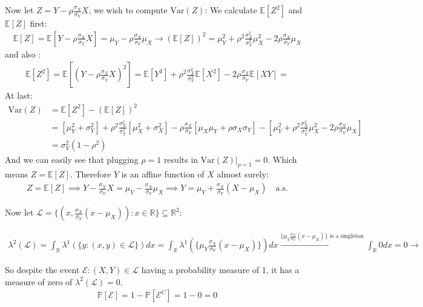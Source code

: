\documentclass{article}
\begin{document}
Now let $Z = Y - \rho\frac{\sigma_X}{\sigma_Y}X  $, we wish to compute $\text{Var}(Z)$:
We calculate $\mathbb{E} [Z^2]$ and $\mathbb{E} [Z]$ first:
\begin{align*}
\mathbb{E} [Z] = \mathbb{E} [  Y - \rho\frac{\sigma_X}{\sigma_Y}X] = \mu_Y - \rho \frac{\sigma_X}{\sigma_Y}\mu_X \xrightarrow{} (\mathbb{E} [Z])^2 = \mu_Y^2 + \rho^2 \frac{\sigma_X^2}{\sigma_Y^2}\mu_X^2 -2\rho\frac{\sigma_X}{\sigma_Y}\mu_X
\end{align*}
and also :
\begin{align*}
\mathbb{E} [Z^2] = \mathbb{E} [  (Y - \rho\frac{\sigma_X}{\sigma_Y}X)^2] = 
\mathbb{E} [Y^2] + \rho^2 \frac{\sigma_X^2}{\sigma_Y^2} \mathbb{E} [X^2] -2\rho\frac{\sigma_X}{\sigma_Y} \mathbb{E} [XY] = 
\end{align*}
At last:
\begin{align*}
\text{Var}(Z) &= \mathbb{E} [Z^2] - (\mathbb{E} [Z])^2 \\
&= [\mu_Y^2 + \sigma_Y^2] + \rho^2 \frac{\sigma_X^2}{\sigma_Y^2} [\mu_X^2 + \sigma_X^2] - \rho\frac{\sigma_X}{\sigma_Y} [\mu_X\mu_Y + \rho \sigma_X\sigma_Y] - \left[ \mu_Y^2 + \rho^2 \frac{\sigma_X^2}{\sigma_Y^2}\mu_X^2 - 2\rho\frac{\sigma_X}{\sigma_Y}\mu_X \right] \\
&= \sigma_Y^2 (1-\rho^2)
\end{align*}
And we can easily see that plugging $\rho=1$ results in $\text{Var}(Z)|_{\rho=1} = 0$. Which means $Z = \mathbb{E}[Z]$. Therefore $Y$ is an affine function of $X$ almost surely:
\begin{align*}
Z = \mathbb{E}[Z] \implies Y - \frac{\sigma_X}{\sigma_Y}X = \mu_Y - \frac{\sigma_X}{\sigma_Y}\mu_X \implies Y = \mu_Y + \frac{\sigma_X}{\sigma_Y}(X-\mu_X) \quad \text{a.s.}
\end{align*}

Now let $\mathcal{L} = \{ (x,\frac{\sigma_X}{\sigma_Y}(x-\mu_X)) : x \in \mathbb{R} \} \subseteq \mathbb{R}^2$:

\begin{align*}
\lambda^2 ( \mathcal{L}) = \int_\mathbb{R} \lambda^1 (\{y: (x,y)\in\mathcal{L}\}) dx = 
\int_\mathbb{R} \lambda^1 (\{\mu_Y \frac{\sigma_X}{\sigma_Y}(x-\mu_X)\}) dx \xrightarrow[]{\{\mu_Y \frac{\sigma_X}{\sigma_Y}(x-\mu_X)\} \text{ is a singleton}} \int_\mathbb{R} 0 dx = 0\xrightarrow[]{} 
\end{align*}

 So despite the event $\mathcal{E}: (X,Y) \in \mathcal{L}$ having a probability measure of 1, it has a measure of zero of $\lambda^2(\mathcal{L})=0$.
\begin{align*}
\mathbb{P} [\mathcal{E}] = 1 - \mathbb{P} [\mathcal{E}^C] = 1-0 = 0
\end{align*}
\end{document}
